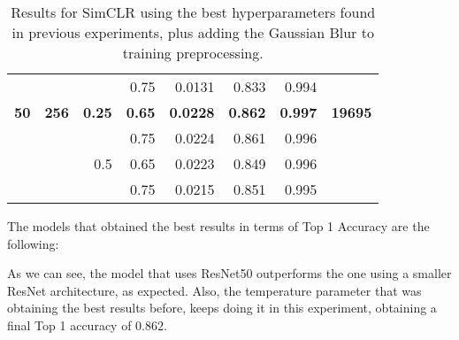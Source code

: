 \begin{table}[H]
{\begin{tabular}{rrrrrrrr}
                  &              &               & 0.75          & 0.0131               & 0.833                   & 0.994                   &                \\
    \textbf{50}   & \textbf{256} & \textbf{0.25} & \textbf{0.65} & \textbf{0.0228}      & \textbf{0.862}          & \textbf{0.997}          & \textbf{19695} \\
                  &              &               & 0.75          & 0.0224               & 0.861                   & 0.996                   &                \\
                  &              & 0.5           & 0.65          & 0.0223               & 0.849                   & 0.996                   &                \\
                  &              &               & 0.75          & 0.0215               & 0.851                   & 0.995                   &               
    \end{tabular}
    }
    \caption{Results for SimCLR using the best hyperparameters found in previous experiments, plus adding the Gaussian Blur to training preprocessing.}
    \label{table:simclr:gridsearch:blur}
    \end{table}


The models that obtained the best results in terms of Top 1 Accuracy are the following:

\begin{table}[H]
    \caption{Best results for the experiment of adding gaussian blur to data augmentation.}
    \label{table:simclr:gridsearch:blur:best}
\end{table}

As we can see, the model that uses ResNet50 outperforms the one using a smaller ResNet architecture, as expected. Also, the temperature parameter that was obtaining the best results before, keeps doing it in this experiment, obtaining a final Top 1 accuracy of $0.862$.




